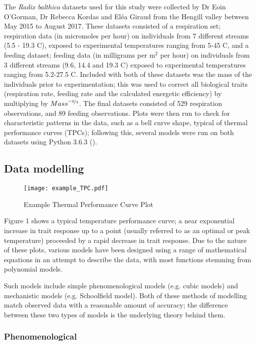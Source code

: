 \documentclass[../../Paper.tex]{subfiles}
\begin{document}
The \textit{Radix balthica} datasets used for this study were collected by Dr Eoin O'Gorman,
Dr Rebecca Kordas and El\'{e}a Giraud from the Hengill valley between May 2015 to August 2017.
These datasets consisted of a respiration set; respiration data (in micromoles per hour) on
individuals from 7 different streams (5.5 - 19.3 \degree C), exposed to experimental
temperatures ranging from 5-45 \degree C, and a feeding dataset; feeding data (in milligrams per m$^{2}$
per hour) on individuals from 3 different streams (9.6, 14.4 and 19.3 \degree C) exposed to experimental
temperatures ranging from 5.2-27.5 \degree C. Included with both of these datasets was the mass of 
the individuals prior to experimentation; this was used to correct all biological traits (respiration 
rate, feeding rate and the calculated energetic efficiency) by multiplying by $Mass^{\nicefrac{-3}{4}}$. The final datasets consisted of 529 respiration observations, 
and 89 feeding observations. Plots were then run to check for characteristic patterns
in the data, such as a bell curve shape, typical of thermal performance curves (TPCs); following this, several models were run on both datasets using Python 3.6.3 (\cite{van_rossum_python_2001}).

\subsection*{Data modelling}

\begin{figure}[H]
\texttt{[image: example\_TPC.pdf]}
\caption{Example Thermal Performance Curve Plot}

\end{figure}

Figure 1 shows a typical temperature performance curve; a near exponential
increase in trait response up to a point (usually referred to as an optimal or peak temperature)
proceeded by a rapid decrease in trait response. Due to the nature of these plots, various models 
have been designed using a range of mathematical equations in an attempt to describe the data, 
with most functions stemming from polynomial models.

Such models include simple phenomenological models (e.g. cubic models) and 
mechanistic models (e.g. Schoolfield model). Both of these methods of modelling 
match observed data with a reasonable amount of accuracy; the difference between 
these two types of models is the underlying theory behind them. 

\subsubsection*{Phenomenological}
\end{document}
